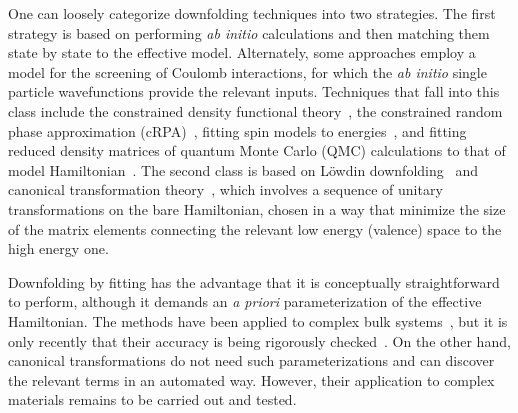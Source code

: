 \documentclass[aps, prb]{revtex4-1}
\begin{document}
One can loosely categorize downfolding techniques into two strategies.
The first strategy is based on performing {\it ab initio} calculations and 
then matching them state by state to the effective model. Alternately, 
some approaches employ a model for the 
screening of Coulomb interactions, for which the {\it ab initio} single particle wavefunctions provide the relevant inputs. 
Techniques that fall into this class include the constrained 
density functional theory~\cite{Pavirini,Dasgupta}, 
the constrained random phase approximation (cRPA)~\cite{Aryasetiawan}, 
fitting spin models to energies~\cite{Valenti_kagome,Spaldin}, 
and fitting reduced density matrices of quantum Monte Carlo (QMC) calculations to that of model Hamiltonian~\cite{Wagner2014}. The second class is based on L\"owdin downfolding~\cite{Freed,Zhou_Ceperley,Tenno} 
and canonical transformation theory~\cite{Glazek_Wilson,Wegner,White_CT,Yanai_CT,Watson_Chan}, 
which involves a sequence of unitary transformations on the 
bare Hamiltonian, chosen in a way that minimize the size of the matrix elements 
connecting the relevant low energy (valence) space to the high energy one.

Downfolding by fitting has the advantage that it 
is conceptually straightforward to perform, although it demands an 
{\it a priori} parameterization of the effective Hamiltonian. 
The methods have been applied to complex bulk systems~\cite{Imada1,Imada2,Arya1,Arya2,Scriven,Wehling2011}, but it 
is only recently that their 
accuracy is being rigorously checked~\cite{RPA_Troyer}. 
On the other hand, canonical transformations do not need 
such parameterizations and can discover the relevant terms in an automated way. 
However, their application to complex materials remains to be carried out 
and tested.
\end{document}

